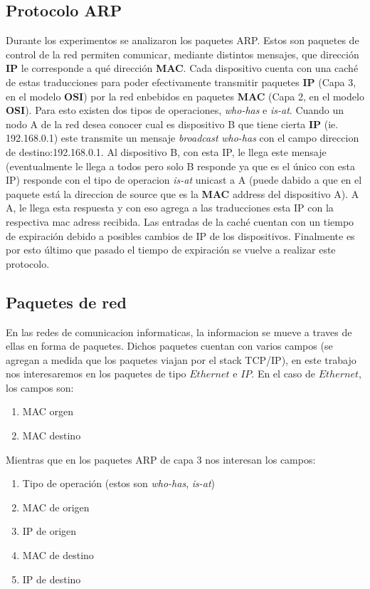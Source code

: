 \subsection{Protocolo ARP}
Durante los experimentos se analizaron los paquetes ARP. Estos son paquetes
de control de la red permiten comunicar, mediante distintos mensajes,
que dirección \textbf{IP} le corresponde a qué dirección \textbf{MAC}. Cada dispositivo
cuenta con una caché de estas traducciones para poder efectivamente
transmitir paquetes \textbf{IP} (Capa 3, en el modelo \textbf{OSI}) por la red enbebidos
en paquetes \textbf{MAC} (Capa 2, en el modelo \textbf{OSI}). Para esto existen
dos tipos de operaciones, \textit{who-has} e \textit{is-at}. Cuando un nodo A
de la red desea conocer cual es dispositivo B que tiene cierta \textbf{IP} (ie. 192.168.0.1)
este transmite un mensaje \textit{broadcast} \textit{who-has} con el campo direccion de destino:192.168.0.1.
Al dispositivo B, con esta IP, le llega este mensaje (eventualmente le llega a todos pero solo B responde ya que es el único con esta IP)
responde con el tipo de operacion \textit{is-at} unicast a A (puede dabido a que en el paquete está la direccion de source
que es la \textbf{MAC} address del dispositivo A). A A, le llega esta respuesta y con eso agrega a las traducciones esta IP con la respectiva mac adress
recibida. Las entradas de la caché cuentan con un tiempo de expiración debido a posibles cambios de IP de los dispositivos. Finalmente
es por esto último que pasado el tiempo de expiración se vuelve a realizar este protocolo.

\subsection{Paquetes de red}

En las redes de comunicacion informaticas, la informacion se mueve a traves de ellas en forma de paquetes. Dichos paquetes cuentan con varios campos (se agregan a medida que los paquetes viajan por el stack TCP/IP), en este trabajo nos interesaremos en los paquetes de tipo $Ethernet$ e $IP$. En el caso de $Ethernet$, los campos son:

\begin{enumerate}
	\item MAC orgen
	\item MAC destino
\end{enumerate}

Mientras que en los paquetes ARP de capa 3 nos interesan los campos:

\begin{enumerate}
	\item Tipo de operación (estos son \emph{who-has}, \emph{is-at})
	\item MAC de origen
	\item IP de origen
	\item MAC de destino
	\item IP de destino
\end{enumerate}
